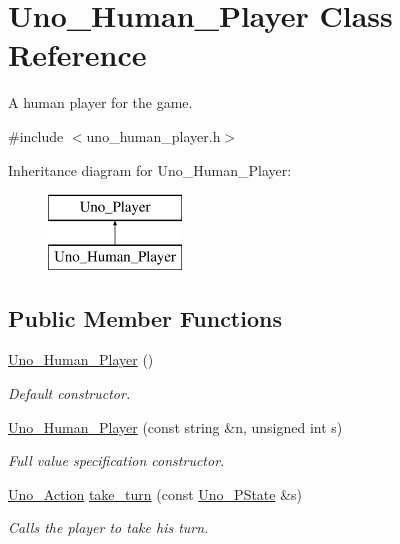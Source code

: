 \hypertarget{class_uno___human___player}{
\section{\-Uno\-\_\-\-Human\-\_\-\-Player \-Class \-Reference}
\label{class_uno___human___player}
}


\-A human player for the game.  




{\ttfamily \#include $<$uno\-\_\-human\-\_\-player.\-h$>$}

\-Inheritance diagram for \-Uno\-\_\-\-Human\-\_\-\-Player\-:\begin{figure}[H]
\begin{center}
\leavevmode
\includegraphics[height=2.000000cm]{class_uno___human___player}
\end{center}
\end{figure}
\subsection*{\-Public \-Member \-Functions}
\begin{DoxyCompactItemize}
\item 
\hyperlink{class_uno___human___player_a7339947e9ae326b26ccd478c2aa23664}{\-Uno\-\_\-\-Human\-\_\-\-Player} ()
\begin{DoxyCompactList}\small\item\em \-Default constructor. \end{DoxyCompactList}\item 
\hyperlink{class_uno___human___player_a126f7617c19e1ff7ca5db185b5b47735}{\-Uno\-\_\-\-Human\-\_\-\-Player} (const string \&n, unsigned int s)
\begin{DoxyCompactList}\small\item\em \-Full value specification constructor. \end{DoxyCompactList}\item 
\hyperlink{class_uno___action}{\-Uno\-\_\-\-Action} \hyperlink{class_uno___human___player_a14a73bddb4791cc7406a0e9cfe65979b}{take\-\_\-turn} (const \hyperlink{class_uno___p_state}{\-Uno\-\_\-\-P\-State} \&s)
\begin{DoxyCompactList}\small\item\em \-Calls the player to take his turn. \end{DoxyCompactList}\end{DoxyCompactItemize}


